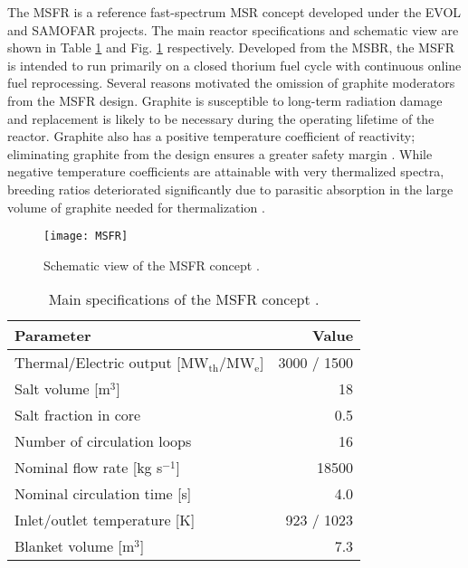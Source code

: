 The \gls{MSFR} is a reference fast-spectrum \gls{MSR} concept developed
under the \gls{EVOL} and \gls{SAMOFAR} projects. The main reactor
specifications and schematic view are shown in Table \ref{table:msfr} and Fig.
\ref{fig:msfr} respectively. Developed from the \gls{MSBR}, the \gls{MSFR} is
intended to run primarily on a closed thorium fuel cycle with
continuous online fuel reprocessing. Several reasons motivated the omission of
graphite moderators from the \gls{MSFR} design. Graphite is susceptible to
long-term radiation damage and replacement is likely to be necessary during
the operating lifetime of the reactor. Graphite also has a positive
temperature coefficient of reactivity; eliminating graphite from the design
ensures a greater safety margin \cite{mathieu_thorium_2006}. While negative
temperature coefficients are attainable with very thermalized spectra,
breeding ratios deteriorated significantly due to parasitic absorption in the
large volume of graphite needed for thermalization
\cite{mathieu_thorium_2006}.
%
\begin{figure}[htb!] 
	\centering
	\texttt{[image: MSFR]}
	\caption{Schematic view of the MSFR concept \cite{serp_molten_2014}.}
	\label{fig:msfr}
\end{figure}
%
\begin{table}[htb!]
	\caption{Main specifications of the \gls{MSFR} concept
				\cite{serp_molten_2014}.}
	\centering
	\begin{tabular}{ l r }
		\hline
		Parameter & Value \\
		\hline
		Thermal/Electric output [MW$_{\text{th}}$/MW$_{\text{e}}$] & 3000 /
		1500 
		\\
		Salt volume [m$^3$] & 18 \\
		Salt fraction in core & 0.5 \\
		Number of circulation loops & 16 \\
		Nominal flow rate [kg s$^{-1}$] & 18500  \\
		Nominal circulation time [s] & 4.0 \\
		Inlet/outlet temperature [K] & 923 / 1023 \\
		Blanket volume [m$^3$] & 7.3\\
		\hline
	\end{tabular}
	\label{table:msfr}
\end{table}

